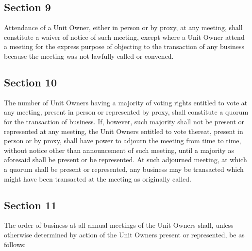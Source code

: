 \documentclass[
  14pt,
]{book}
\begin{document}
\hypertarget{section-9}{%
\subsection*{Section 9}\label{section-9}}

Attendance of a Unit Owner, either in person or by proxy, at any meeting, shall constitute a waiver of notice of such meeting, except where a Unit Owner attend a meeting for the express purpose of objecting to the transaction of any business because the meeting was not lawfully called or convened.

\hypertarget{section-10}{%
\subsection*{Section 10}\label{section-10}}

The number of Unit Owners having a majority of voting rights entitled to vote at any meeting, present in person or represented by proxy, shall constitute a quorum for the transaction of business. If, however, such majority shall not be present or represented at any meeting, the Unit Owners entitled to vote thereat, present in person or by proxy, shall have power to adjourn the meeting from time to time, without notice other than announcement of such meeting, until a majority as aforesaid shall be present or be represented. At such adjourned meeting, at which a quorum shall be present or represented, any business may be transacted which might have been transacted at the meeting as originally called.

\hypertarget{section-11}{%
\subsection*{Section 11}\label{section-11}}

The order of business at all annual meetings of the Unit Owners shall, unless otherwise determined by action of the Unit Owners present or represented, be as follows:
\end{document}
